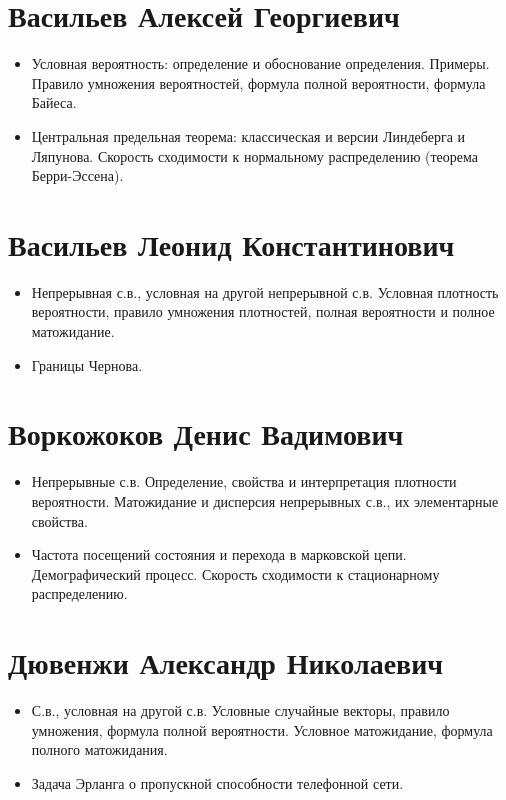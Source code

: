 \documentclass[12pt]{article}
\begin{document}
\section{Васильев Алексей Георгиевич}

\begin{itemize}
  \item Условная вероятность: определение и обоснование определения. Примеры. Правило умножения вероятностей, формула полной вероятности, формула Байеса.
  \item Центральная предельная теорема: классическая и версии Линдеберга и Ляпунова. Скорость сходимости к нормальному распределению (теорема Берри-Эссена).
\end{itemize}

\section{Васильев Леонид Константинович}

\begin{itemize}
  \item Непрерывная с.в., условная на другой непрерывной с.в. Условная плотность вероятности, правило умножения плотностей, полная вероятности и полное матожидание.
  \item Границы Чернова. 
\end{itemize}

\section{Воркожоков Денис Вадимович}

\begin{itemize}
  \item Непрерывные с.в. Определение, свойства и интерпретация плотности вероятности. Матожидание и дисперсия непрерывных с.в., их элементарные свойства.
  \item Частота посещений состояния и перехода в марковской цепи. Демографический процесс. Скорость сходимости к стационарному распределению.
\end{itemize}

\section{Дювенжи Александр Николаевич}

\begin{itemize}
  \item С.в., условная на другой с.в. Условные случайные векторы, правило умножения, формула полной вероятности. Условное матожидание, формула полного матожидания.
  \item Задача Эрланга о пропускной способности телефонной сети.
\end{itemize}
\end{document}
